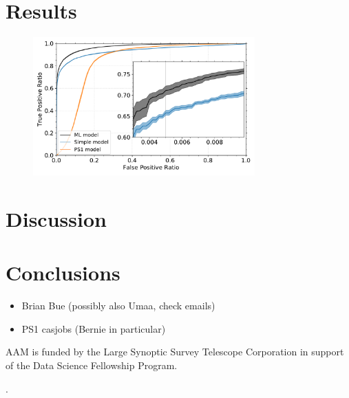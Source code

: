 \documentclass[twocolumn]{aastex62}
\begin{document}
\section{Results}

\begin{figure}[t]
 \centering
  \includegraphics[width=3.35in]{./Figures/CV_ROC_HST.pdf}
  \caption{}
  \label{fig:cvroc_hst}
\end{figure}


\section{Discussion}

\section{Conclusions}

\acknowledgements

\begin{itemize}
    \item Brian Bue (possibly also Umaa, check emails)
    \item PS1 casjobs (Bernie in particular)
\end{itemize}

AAM is funded by the Large Synoptic Survey Telescope Corporation in support of
the Data Science Fellowship Program.


.


\appendix




\end{document}
